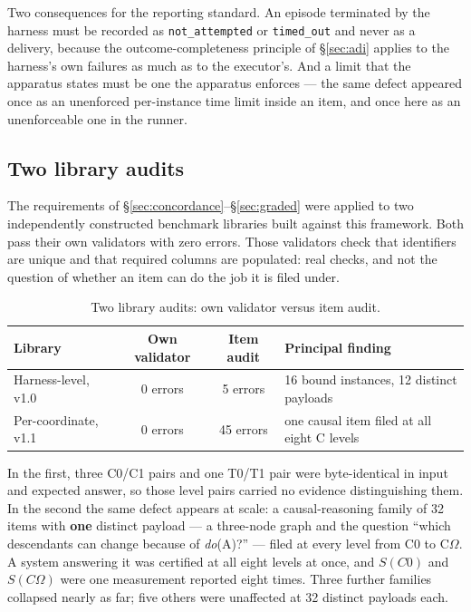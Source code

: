 \documentclass[11pt]{article}
\theoremstyle{definition}
\newcommand{\Om}{\ensuremath{\Omega}}
\begin{document}
Two consequences for the reporting standard. An episode terminated by the harness must be recorded as \texttt{not\_attempted} or \texttt{timed\_out} and never as a delivery, because the outcome-completeness principle of \S\ref{sec:adi} applies to the harness's own failures as much as to the executor's. And a limit that the apparatus states must be one the apparatus enforces --- the same defect appeared once as an unenforced per-instance time limit inside an item, and once here as an unenforceable one in the runner.

\subsection{Two library audits}\label{sec:libraries}

The requirements of \S\ref{sec:concordance}--\S\ref{sec:graded} were applied to two independently constructed benchmark libraries built against this framework. Both pass their own validators with zero errors. Those validators check that identifiers are unique and that required columns are populated: real checks, and not the question of whether an item can do the job it is filed under.

\begin{table}[!htbp]
\centering\small
\begin{tabularx}{\textwidth}{@{}lccY@{}}
\toprule
Library & Own validator & Item audit & Principal finding \\
\midrule
Harness-level, v1.0 & 0 errors & 5 errors & 16 bound instances, 12 distinct payloads \\
Per-coordinate, v1.1 & 0 errors & 45 errors & one causal item filed at all eight C levels \\
\bottomrule
\end{tabularx}
\caption{Two library audits: own validator versus item audit.}
\label{tab:libaudits}
\end{table}

In the first, three C0/C1 pairs and one T0/T1 pair were byte-identical in input and expected answer, so those level pairs carried no evidence distinguishing them. In the second the same defect appears at scale: a causal-reasoning family of 32 items with \textbf{one} distinct payload --- a three-node graph and the question ``which descendants can change because of \emph{do}(A)?'' --- filed at every level from C0 to C\Om{}. A system answering it was certified at all eight levels at once, and $S(C0)$ and $S(C\Om{})$ were one measurement reported eight times. Three further families collapsed nearly as far; five others were unaffected at 32 distinct payloads each.
\end{document}
